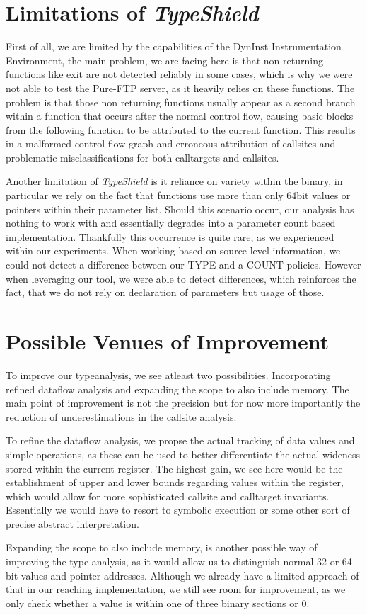 \section{Limitations of \textit{TypeShield}}
First of all, we are limited by the capabilities of the DynInst Instrumentation Environment, the main problem, we are facing here is that non returning functions like exit are not detected reliably in some cases, which is why we were not able to test the Pure-FTP server, as it heavily relies on these functions. The problem is that those non returning functions usually appear as a second branch within a function that occurs after the normal control flow, causing basic blocks from the following function to be attributed to the current function. This results in a malformed control flow graph and erroneous attribution of callsites and problematic misclassifications for both calltargets and callsites.

Another limitation of \textit{TypeShield} is it reliance on variety within the binary, in particular we rely on the fact that functions use more than only 64bit values or pointers within their parameter list. Should this scenario occur, our analysis has nothing to work with and essentially degrades into a parameter count based implementation. Thankfully this occurrence is quite rare, as we experienced within our experiments. When working based on source level information, we could not detect a difference between our TYPE and a COUNT policies. However when leveraging our tool, we were able to detect differences, which reinforces the fact, that we do not rely on declaration of parameters but usage of those.


\section{Possible Venues of Improvement}
To improve our typeanalysis, we see atleast two possibilities. Incorporating refined dataflow analysis and expanding the scope to also include memory. The main point of improvement is not the precision but for now more importantly the reduction of underestimations in the callsite analysis.

To refine the dataflow analysis, we propse the actual tracking of data values and simple operations, as these can be used to better differentiate the actual wideness stored within the current register. The highest gain, we see here would be the establishment of upper and lower bounds regarding values within the register, which would allow for more sophisticated callsite and calltarget invariants. Essentially we would have to resort to symbolic execution or some other sort of precise abstract interpretation.

Expanding the scope to also include memory, is another possible way of improving the type analysis, as it would allow us to distinguish normal 32 or 64 bit values and pointer addresses. Although we already have a limited approach of that in our reaching implementation, we still see room for improvement, as we only check whether a value is within one of three binary sections or 0.
